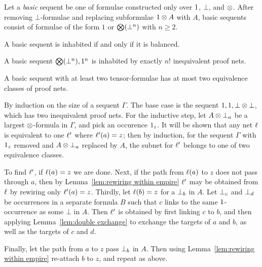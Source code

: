 \documentclass[conference]{IEEEtran}
\begin{document}
Let a \emph{basic} sequent be one of formulae constructed only over $1$, $\bot$, and $\otimes$.
%
After removing $\bot$-formulae and replacing subformulae $1\otimes A$ with $A$, basic sequents consist of formulae of the form $1$ or $\bigotimes(\bot^n)$ with $n\geq2$.


\begin{proposition}
A basic sequent is inhabited if and only if it is balanced.
\end{proposition}

\begin{proposition}
A basic sequent $\bigotimes(\bot^n),1^n$ is inhabited by exactly $n!$ inequivalent proof nets.
\end{proposition}

\begin{proposition}
\label{prop:level0 max binary}
%
A basic sequent with at least two tensor-formulae has at most two equivalence classes of proof nets.
%
\end{proposition}


\begin{IEEEproof}
By induction on the size of a sequent $\Gamma$.
%
The base case is the sequent $1,1,\bot\otimes\bot$, which has two inequivalent proof nets.
%
For the inductive step, let $A\otimes\bot_{a}$ be a largest $\otimes$-formula in $\Gamma$, and pick an occurence $1_{z}$.
%
It will be shown that any net $\ell$ is equivalent to one $\ell'$ where $\ell'(a)=z$; then by induction, for the sequent $\Gamma$ with $1_{z}$ removed and $A\otimes\bot_{a}$ replaced by $A$, the subnet for $\ell'$ belongs to one of two equivalence classes.


To find $\ell'$, if $\ell(a)=z$ we are done.
%
Next, if the path from $\ell(a)$ to $z$ does not pass through $a$, then by Lemma~\ref{lem:rewiring within empire} $\ell'$ may be obtained from $\ell$ by rewiring only $\ell'(a)=z$.
%
Thirdly, let $\ell(b)=z$ for a $\bot_{b}$ in $A$.
%
Let $\bot_{c}$ and $\bot_{d}$ be occurrences in a separate formula $B$ such that $c$ links to the same $1$-occurrence as some $\bot$ in $A$.
%
Then $\ell'$ is obtained by first linking $c$ to $b$, and then applying Lemma~\ref{lem:double exchange} to exchange the targets of $a$ and $b$, as well as the targets of $c$ and $d$.


Finally, let the path from $a$ to $z$ pass $\bot_{b}$ in $A$.
%
Then using Lemma~\ref{lem:rewiring within empire} re-attach $b$ to $z$, and repeat as above.
\end{IEEEproof}
\end{document}
